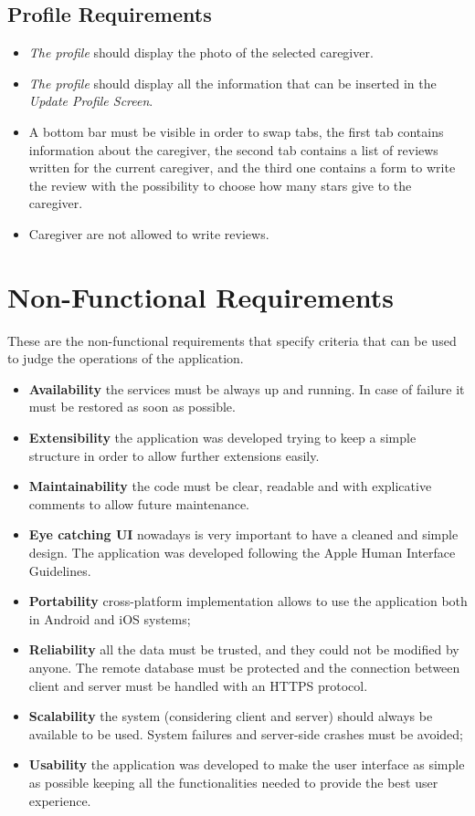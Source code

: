 \documentclass[../../dd.tex]{subfiles}
\begin{document}
    \subsection{Profile Requirements}
    \begin{itemize}
        \item \textit{The profile} should display the photo of the selected caregiver.
        \item \textit{The profile} should display all the information that can be inserted in the \textit{Update Profile Screen}.
        \item A bottom bar must be visible in order to swap tabs, the first tab contains information about the caregiver, the second tab
        contains a list of reviews written for the current caregiver, and the third one contains a form to write the review with the possibility
        to choose how many stars give to the caregiver.
        \item Caregiver are not allowed to write reviews.
    \end{itemize}

    \section{Non-Functional Requirements}
    These are the non-functional requirements that specify criteria that can be
    used to judge the operations of the application.
    \begin{itemize}
        \item \textbf{Availability} the services must be always up and running.
        In case of failure it must be restored as soon as possible.
        \item \textbf{Extensibility} the application was developed trying to keep a simple
        structure in order to allow further extensions easily.
        \item \textbf{Maintainability} the code must be clear, readable and with explicative
        comments to allow future maintenance.
        \item \textbf{Eye catching UI} nowadays is very important to have a cleaned
        and simple design.
        The application was developed following the Apple
        Human Interface Guidelines.
        \item \textbf{Portability} cross-platform implementation allows to use the application both in Android and iOS systems;
        \item \textbf{Reliability} all the data must be trusted, and they could not be modified
        by anyone.
        The remote database must be protected and the connection
        between client and server must be handled with an HTTPS protocol.
        \item \textbf{Scalability} the system (considering client and server) should always
        be available to be used.
        System failures and server-side crashes must be avoided;
        \item \textbf{Usability} the application was developed to make the user interface as
        simple as possible keeping all the functionalities needed to provide the
        best user experience.

    \end{itemize}
\end{document}
